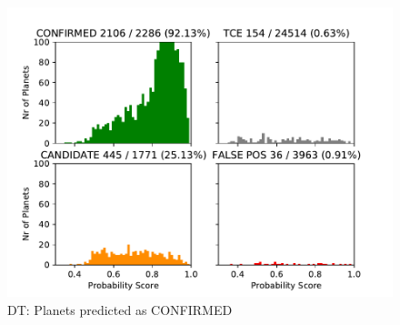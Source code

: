 
\begin{figure}[H]
                \begin{mdframed}[linecolor=green]
                \centering
                \includegraphics[width = 1\textwidth,height=.4\textheight]{data/DT_pred_confirm.pdf}
                \caption{DT: Planets predicted as CONFIRMED}
                \label{fig:data/DT_pred_confirm}
                \end{mdframed}
                \end{figure}